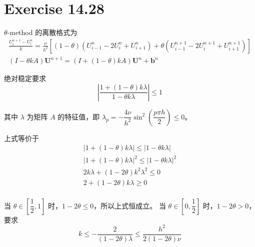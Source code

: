 \documentclass[a4paper]{article}
\begin{document}
\section*{Exercise 14.28}

\par $\theta$-method 的离散格式为
\begin{equation}
    \begin{gathered}
        \frac{U_{i}^{n+1}-U_{i}^{n}}{k} 
        = \frac{\nu}{h^2}
        \left[
            (1-\theta)\left(
                U_{i-1}^{n}-2U_{i}^{n}+U_{i+1}^{n}
            \right) + \theta
            \left(
                U_{i-1}^{n+1}-2U_{i}^{n+1}+U_{i+1}^{n+1}
            \right)
        \right]\\
        \left(
            I - \theta kA
        \right)\mathbf{U}^{n+1} = \left(
            I + (1-\theta)kA
        \right)\mathbf{U}^{n} + \mathbf{b}^{n}
    \end{gathered}
\end{equation}
\par 绝对稳定要求
\begin{equation}
    \left|\frac{1+(1-\theta)k\lambda}{1-\theta k\lambda}\right|
    \leq 1
\end{equation}
\par 其中 $\lambda$ 为矩阵 $A$ 的特征值，即 
$\lambda_p = -\dfrac{4\nu}{h^2}\sin^2\left(\dfrac{p\pi h}{2}\right)\leq 0$。
\par 上式等价于
\begin{equation}
    \begin{gathered}
        \left|1+(1-\theta)k\lambda\right|
        \leq \left|1-\theta k\lambda\right|\\
        \left|1+(1-\theta)k\lambda\right|^2
        \leq \left|1-\theta k\lambda\right|^2\\
        2k\lambda + (1-2\theta)k^2\lambda^2
        \leq 0\\
        2 + (1-2\theta)k\lambda
        \geq 0\\
    \end{gathered}
\end{equation}
\par 当 $\theta \in \left[\dfrac{1}{2}, 1\right]$ 时，$1-2\theta \leq 0$，所以上式恒成立。
当 $\theta \in \left[0, \dfrac{1}{2}\right]$ 时，$1-2\theta > 0$，要求
\begin{equation}
    k \leq -\frac{2}{(1-2\theta)\lambda} 
    \leq \frac{h^2}{2(1-2\theta)\nu}
\end{equation}
\end{document}
